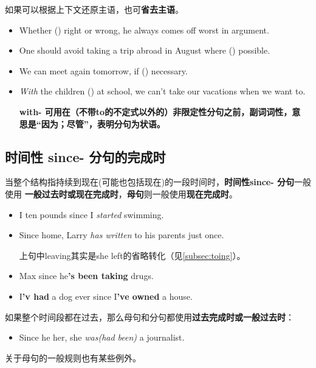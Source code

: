 如果可以根据上下文还原主语，也可\textbf{省去主语}。
\begin{itemize}
\item Whether () right or wrong, he always comes off worst in
  argument.

\item One should avoid taking a trip abroad in August where () possible.

\item We can meet again tomorrow, if () necessary.

\item \emph{With} the children () at school, we can't take our
  vacations when we want to.

  \textbf{with- 可用在（不带to的不定式以外的）非限定性分句之前，副词词性，意
    思是“因为；尽管”，表明分句为状语。}
\end{itemize}

\subsection{时间性 since- 分句的完成时}

当整个结构指持续到现在(可能也包括现在)的一段时间时，\textbf{时间性since- 分句}一般使用
\textbf{一般过去时或现在完成时}，\textbf{母句}则一般使用\textbf{现在完成时}。

\begin{itemize}
\item I  ten pounds since I \emph{started} swimming.
\item Since  home, Larry \emph{has written} to his parents just once.

  上句中leaving其实是she left的省略转化（见\cref{subsec:toing}）。

\item Max  since he\textbf{'s been taking} drugs.
\item I\textbf{'v had} a dog ever since I\textbf{'ve owned} a house.
\end{itemize}

如果整个时间段都在过去，那么母句和分句都使用\textbf{过去完成时或一般过去时}：
\begin{itemize}
\item Since he  her, she \emph{was(had been)} a journalist.
\end{itemize}

关于母句的一般规则也有某些例外。
\begin{description}

\end{description}

